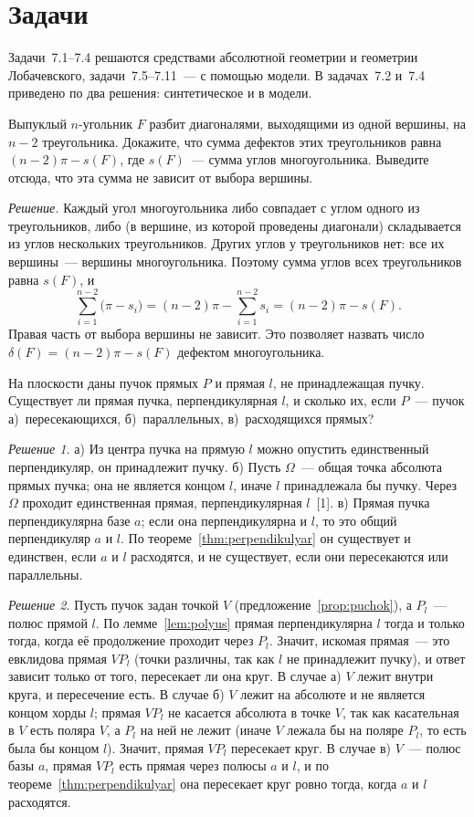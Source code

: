 \section{Задачи}

Задачи~7.1--7.4 решаются средствами абсолютной геометрии и геометрии Лобачевского, задачи~7.5--7.11~--- с помощью модели. В задачах~7.2 и~7.4 приведено по два решения: синтетическое и в модели.

\begin{task}
Выпуклый $n$-угольник $F$ разбит диагоналями, выходящими из одной вершины, на $n-2$ треугольника. Докажите, что сумма дефектов этих треугольников равна $(n-2)\pi-s(F)$, где $s(F)$~--- сумма углов многоугольника. Выведите отсюда, что эта сумма не зависит от выбора вершины.
\end{task}
\textit{Решение.} Каждый угол многоугольника либо совпадает с углом одного из треугольников, либо (в вершине, из которой проведены диагонали) складывается из углов нескольких треугольников. Других углов у треугольников нет: все их вершины~--- вершины многоугольника. Поэтому сумма углов всех треугольников равна $s(F)$, и
\[
\sum_{i=1}^{n-2}\bigl(\pi-s_i\bigr)=(n-2)\pi-\sum_{i=1}^{n-2}s_i=(n-2)\pi-s(F).
\]
Правая часть от выбора вершины не зависит. Это позволяет назвать число $\delta(F)=(n-2)\pi-s(F)$ дефектом многоугольника.

\begin{task}
На плоскости даны пучок прямых $P$ и прямая $l$, не принадлежащая пучку. Существует ли прямая пучка, перпендикулярная $l$, и сколько их, если $P$~--- пучок а)~пересекающихся, б)~параллельных, в)~расходящихся прямых?
\end{task}
\textit{Решение 1.} а) Из центра пучка на прямую $l$ можно опустить единственный перпендикуляр, он принадлежит пучку. б) Пусть $\Omega$~--- общая точка абсолюта прямых пучка; она не является концом $l$, иначе $l$ принадлежала бы пучку. Через $\Omega$ проходит единственная прямая, перпендикулярная $l$~[1]. в) Прямая пучка перпендикулярна базе $a$; если она перпендикулярна и $l$, то это общий перпендикуляр $a$ и $l$. По теореме~\ref{thm:perpendikulyar} он существует и единствен, если $a$ и $l$ расходятся, и не существует, если они пересекаются или параллельны.

\textit{Решение 2.} Пусть пучок задан точкой $V$ (предложение~\ref{prop:puchok}), а $P_l$~--- полюс прямой $l$. По лемме~\ref{lem:polyus} прямая перпендикулярна $l$ тогда и только тогда, когда её продолжение проходит через $P_l$. Значит, искомая прямая~--- это евклидова прямая $VP_l$ (точки различны, так как $l$ не принадлежит пучку), и ответ зависит только от того, пересекает ли она круг. В случае а) $V$ лежит внутри круга, и пересечение есть. В случае б) $V$ лежит на абсолюте и не является концом хорды $l$; прямая $VP_l$ не касается абсолюта в точке $V$, так как касательная в $V$ есть поляра $V$, а $P_l$ на ней не лежит (иначе $V$ лежала бы на поляре $P_l$, то есть была бы концом $l$). Значит, прямая $VP_l$ пересекает круг. В случае в) $V$~--- полюс базы $a$, прямая $VP_l$ есть прямая через полюсы $a$ и $l$, и по теореме~\ref{thm:perpendikulyar} она пересекает круг ровно тогда, когда $a$ и $l$ расходятся.

